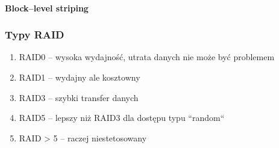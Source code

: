 \documentclass[12pt]{article}
\begin{document}
\paragraph{Block--level striping}

\subsubsection{Typy \acs{RAID}}
\begin{enumerate}
\item \ac{RAID}0 -- wysoka wydajność, utrata danych nie może być problemem
\item \ac{RAID}1 -- wydajny ale kosztowny
\item \ac{RAID}3 -- szybki transfer danych
\item \ac{RAID}5 -- lepszy niż RAID3 dla dostępu typu ``random``
\item \ac{RAID} > 5 -- raczej niestetosowany
\end{enumerate}
\end{document}
